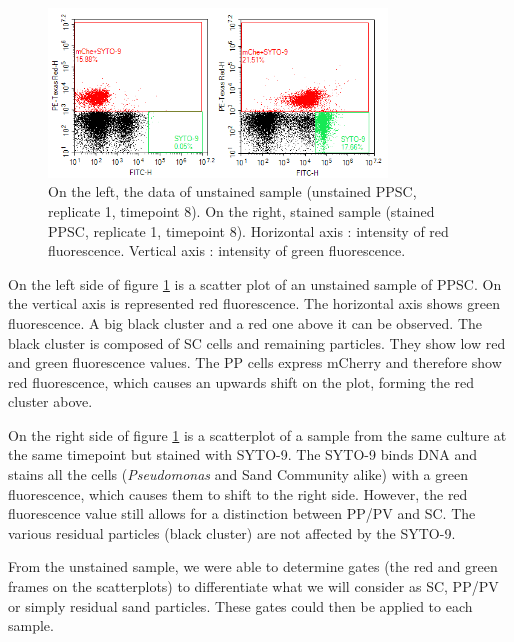 \documentclass[a4paper, 10pt, conference]{ieeeconf}   %
\begin{document}
\begin{figure} [H]
	\centering
	 
		\includegraphics[width=9cm]{t8_unstained_ppsc11.PNG}
		\caption{On the left, the data of unstained sample (unstained PPSC, replicate 1, timepoint 8). On the right, stained sample (stained PPSC, replicate 1, timepoint 8). Horizontal axis : intensity of red fluorescence. Vertical axis : intensity of green fluorescence.}
		\label{scatterplot}
	  
\end{figure}

On the left side of figure \ref{scatterplot} is a scatter plot of an unstained sample of PPSC. On the vertical axis is represented red fluorescence. The horizontal axis shows green fluorescence. A big black cluster and a red one above it can be observed. The black cluster is composed of SC cells and remaining particles. They show  low red and green fluorescence values. The PP cells express mCherry and therefore show red fluorescence, which causes an upwards shift on the plot, forming the red cluster above.

On the right side of figure \ref{scatterplot} is a scatterplot of a sample from the same culture at the same timepoint but stained with SYTO-9. The SYTO-9 binds DNA and stains all the cells (\textit{Pseudomonas} and Sand Community alike) with a green fluorescence, which causes them to shift to the right side. However, the red fluorescence value still allows for a distinction between PP/PV and SC. The various residual particles (black cluster) are not affected by the SYTO-9. 

From the unstained sample, we were able to determine gates (the red and green frames on the scatterplots) to differentiate what we will consider as SC, PP/PV or simply residual sand particles. These gates could then be applied to each sample.
\end{document}
